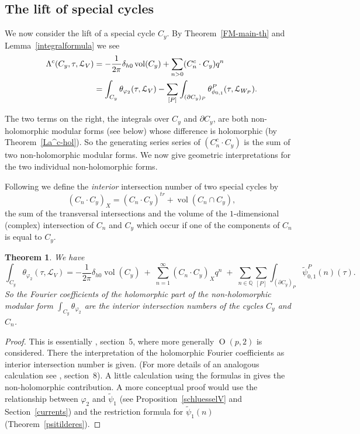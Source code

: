 \documentclass[12pt,leqno]{amsart}
\numberwithin{equation}{section}
\theoremstyle{plain}
\newtheorem{theorem}{Theorem}[section]
\theoremstyle{definition}
\theoremstyle{remark}
\newcommand{\Q}{\mathbb{Q}}
\newcommand{\La}{\Lambda}
\newcommand{\calL}{\mathcal{L}}
\newcommand{\vol}{\operatorname{vol}}
\newcommand{\Orth}{\operatorname{O}}
\begin{document}
\subsection{The lift of special cycles}\label{special-lift-section}

We now consider the lift of a special cycle $C_y$. By Theorem~\ref{FM-main-th} and Lemma~\ref{integralformula} we see
\begin{align}\label{special-lift}
\La^c(C_y,\tau,\calL_V) &= -\frac{1}{2\pi}\delta_{h0} \vol(C_y) + \sum_{n>0} ( C^c_n \cdot C_y) q^n \\
&= \int_{C_y} \theta_{\varphi_2}(\tau,\calL_V) - \sum_{[P]}\int_{(\partial C_y)_P} \theta^P_{\phi_{0,1}}(\tau,\calL_{W_P}). \notag
\end{align}

The two terms on the right, the integrals over $C_y$ and ${\partial C_y}$, are both non-holomorphic modular forms (see below) whose difference is holomorphic (by Theorem~\ref{La^c-hol}). So the generating series series of $(C^c_n \cdot C_y)$ is the sum of two non-holomorphic modular forms. We now give geometric interpretations for the two individual non-holomorphic forms. 

Following \cite{HZ} we define the {\it interior} intersection number of two special cycles by
\[
( C_n \cdot C_y )_X =  (C_n \cdot C_y )^{tr} + \vol(C_n \cap C_y),
\]
the sum of the transversal intersections and the volume of the $1$-dimensional (complex) intersection of  $C_n$ and $C_y$ which occur if one of the components of $C_n$ is equal to $C_y$. 

\begin{theorem}\label{interior-lift}
We have
\[
 \int_{C_y} \theta_{\varphi_2}(\tau,\calL_V) = -\frac{1}{2\pi}\delta_{h0} \vol(C_y) \:+\; 
 \sum_{n=1}^{\infty} ( C_n \cdot C_y )_X q^n \; + \; \sum_{n \in \Q} \sum_{[P]} \int_{(\partial C_y)_{P}}  {\tilde{\psi}_{0,1}^P}(n)(\tau).
 \]
 So the Fourier coefficients of the holomorphic part of the non-holomorphic modular form $\int_{C_y} \theta_{\varphi_2}$ are the interior intersection numbers of the cycles $C_y$ and $C_n$. 
\end{theorem}

\begin{proof}
This is essentially \cite{FCompo}, section~5, where more generally $\Orth(p,2)$ is considered. 
There the interpretation of the holomorphic Fourier coefficients as interior intersection number is given. (For more details of an analogous calculation see \cite{FMspec}, section~8). A little calculation using the formulas in \cite{FCompo} gives the non-holomorphic contribution. A more conceptual proof would use the relationship between $\varphi_2$ and $\tilde{\psi}_1$ (see Proposition~\ref{schluesselV} and Section~\ref{currents}) and the restriction formula for $\tilde{\psi}_1(n)$ (Theorem~\ref{psitilderes}). 
\end{proof}
\end{document}
